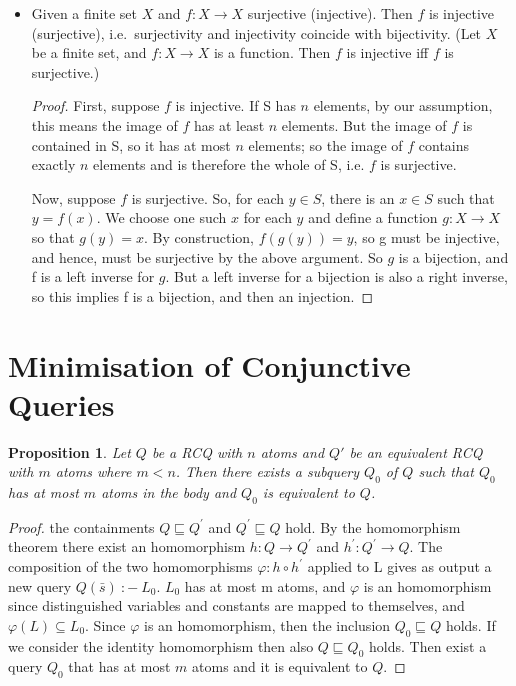 \documentclass[a4paper,12pt]{article}
\newtheorem{prop}{Proposition}
\newcommand{\query}[3]{\ensuremath{{#1}({#2})\:{:}{-}\:{#3}}}
\renewcommand{\phi}{\varphi}
\begin{document}
\begin{itemize}
{To show that $f$ is surjective, assume to the contrary that $f$ is not surjective. Then, there is $y \in Y$ such that there is no $x \in X$ with $f(x) = y$. This means that there is no $y \in Y$ such that $z \in Z$ with $g(y) = z$, which contradicts that $g$ is surjective (see previous proof).
}
\item{
Given a finite set $X$ and $f : X \rightarrow X$ surjective (injective). Then $f$ is injective (surjective), i.e.\ surjectivity and injectivity coincide with bijectivity.
(Let $X$ be a finite set, and $f: X \rightarrow X $ is a function. Then $f$ is injective iff $f$ is surjective.)
\begin{proof}
 First, suppose $f$ is injective. If S has $n$ elements, by our assumption, this means the image of $f$ has at least $n$ elements. But the image of $f$ is contained in S, so it has at most $n$ elements; so the image of $f$ contains exactly $n$ elements and is therefore the whole of S, i.e. $f$ is surjective.

 Now, suppose $f$ is surjective. So, for each $y \in S$, there is an $x \in S$ such that $y=f(x)$. We choose one such $x$ for each $y$ and define a function $g:X \rightarrow X$ so that $g(y)=x$. By construction, $f(g(y))=y$, so g must be injective, and hence, must be surjective by the above argument. So $g$ is a bijection, and f is a left inverse for $g$. But a left inverse for a bijection is also a right inverse, so this implies f is a bijection, and then an injection.
\end{proof}
}
\end{itemize}

\section{Minimisation of Conjunctive Queries}


\begin{prop} Let $Q$ be a RCQ with $n$ atoms and $Q'$ be an equivalent RCQ with $m$ atoms where $m < n$. Then there exists a subquery $Q_0$ of $Q$ such that $Q_0$ has at most $m$ atoms in the body and $Q_0$ is equivalent to $Q$.
\end{prop}

\begin{proof}
the containments $Q \sqsubseteq Q^{'}$ and $Q^{'} \sqsubseteq Q$ hold. By the homomorphism theorem there exist an homomorphism $h : Q \rightarrow Q^{'} $ and $h^{'} : Q^{'} \rightarrow Q $. The composition of the two homomorphisms $\phi : h \circ h^{'}$ applied to L gives as output a new query $\query{Q}{\bar{s}}{L_0}$. $L_0$ has at most m atoms, and $\phi$ is an homomorphism since distinguished variables and constants are mapped to themselves, and $\phi (L) \subseteq L_0$.
Since $\phi$ is an homomorphism, then the inclusion $Q_0 \sqsubseteq Q$ holds. 
If we consider the identity homomorphism then also $Q \sqsubseteq Q_0$ holds. Then exist a query $Q_0$ that has at most $m$ atoms and it is equivalent to $Q$.

\end{proof}
\end{document}
